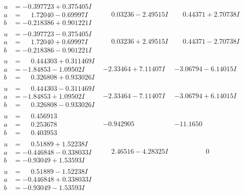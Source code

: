 \documentclass[1p]{elsarticle_modified}
\theoremstyle{definition}
\begin{document}
$$\begin{array}{c|c|c}
\begin{aligned}
u &= -0.397723 + 0.375405 I \\
a &= \phantom{-}1.72040 - 0.69997 I \\
b &= -0.218386 + 0.901221 I\end{aligned}
 & \phantom{-}0.03236 - 2.49515 I & \phantom{-}0.44371 + 2.70738 I \\ \hline\begin{aligned}
u &= -0.397723 - 0.375405 I \\
a &= \phantom{-}1.72040 + 0.69997 I \\
b &= -0.218386 - 0.901221 I\end{aligned}
 & \phantom{-}0.03236 + 2.49515 I & \phantom{-}0.44371 - 2.70738 I \\ \hline\begin{aligned}
u &= \phantom{-}0.444303 + 0.311469 I \\
a &= -1.84853 - 1.09502 I \\
b &= \phantom{-}0.326808 + 0.933026 I\end{aligned}
 & -2.33464 + 7.11407 I & -3.06794 - 6.14015 I \\ \hline\begin{aligned}
u &= \phantom{-}0.444303 - 0.311469 I \\
a &= -1.84853 + 1.09502 I \\
b &= \phantom{-}0.326808 - 0.933026 I\end{aligned}
 & -2.33464 - 7.11407 I & -3.06794 + 6.14015 I \\ \hline\begin{aligned}
u &= \phantom{-}0.456913\phantom{ +0.000000I} \\
a &= \phantom{-}0.253678\phantom{ +0.000000I} \\
b &= \phantom{-}0.403953\phantom{ +0.000000I}\end{aligned}
 & -0.942905\phantom{ +0.000000I} & -11.1650\phantom{ +0.000000I} \\ \hline\begin{aligned}
u &= \phantom{-}0.51889 + 1.52238 I \\
a &= -0.446848 - 0.338033 I \\
b &= -0.93049 + 1.53593 I\end{aligned}
 & \phantom{-}2.46516 - 4.28325 I & \phantom{-0.000000 } 0 \\ \hline\begin{aligned}
u &= \phantom{-}0.51889 - 1.52238 I \\
a &= -0.446848 + 0.338033 I \\
b &= -0.93049 - 1.53593 I\end{aligned}

\end{array}$$
\end{document}
